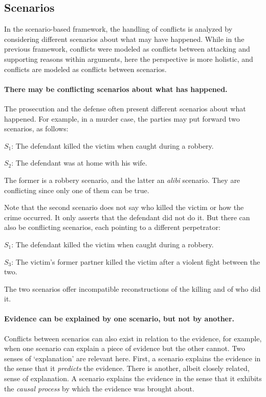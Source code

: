 \documentclass[10pt]{article}
\begin{document}
\subsection{Scenarios}

In the scenario-based framework, the handling of conflicts 
is analyzed by considering different scenarios about what may have happened. While in the previous framework, conflicts were 
modeled as conflicts between attacking and supporting reasons within arguments, 
here the perspective is more holistic, and conflicts 
are modeled as conflicts between scenarios.

 \paragraph{There may be conflicting scenarios about what has happened.} 
The prosecution and the defense often 
present different scenarios about what happened. For example, 
in a murder case, the parties may put forward two scenarios, as follows:

\begin{description}
	\item $S_1$: The defendant killed the victim when caught during a robbery.
	\item $S_2$: The defendant was at home with his wife.	
\end{description}

\noindent The former is a robbery scenario, and the latter an \textit{alibi} scenario. They are conflicting since 
only one of them can be true. 

Note that the second scenario does not say who killed the victim or how the crime occurred. 
It only asserts that the defendant did not do it.
But there can also be conflicting scenarios, each pointing to a different perpetrator:

\begin{description}
	\item $S_1$: The defendant killed the victim when caught during a robbery.
	\item $S_3$: The victim's former partner killed the victim after a violent fight between the two.
\end{description}
%
The two scenarios offer incompatible reconstructions of the killing 
and of who did it. 

\paragraph{Evidence can be explained by one scenario, but not by another.} 
Conflicts between scenarios can also exist in relation to the evidence, for example, when one scenario 
can explain a piece of evidence but the other cannot.  Two senses of `explanation' are relevant here. First, 
a scenario explains the evidence in the sense that it \textit{predicts} the evidence. 
There is another, albeit closely related, sense of explanation.  
A scenario explains the evidence in the sense that it exhibits the \textit{causal process} by which the evidence 
was brought about. 
\end{document}
